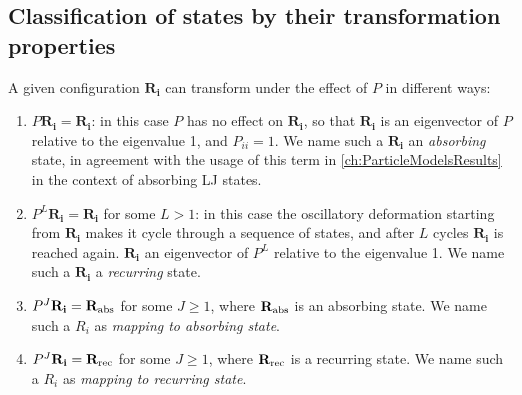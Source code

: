 \subsection{Classification of states by their transformation properties \label{sec:TMStateClassification}}

A given configuration $\mathbf{R_{i}}$ can transform under the effect of $P$ in different ways:
\begin{enumerate}
	\item \label{it:AbsorbingState} $P \mathbf{R_{i}} = \mathbf{R_{i}}$: in this case $P$ has no effect on $\mathbf{R_{i}}$, so that $\mathbf{R_{i}}$ is an eigenvector of $P$ relative to the eigenvalue 1, and $P_{ii}=1$. We name such a $\mathbf{R_{i}}$ an \emph{absorbing} state, in agreement with the usage of this term in \autoref{ch:ParticleModelsResults} in the context of absorbing LJ states.
	\item \label{it:RecurringState} $P^{L} \mathbf{R_{i}} = \mathbf{R_{i}}$ for some $L > 1$: in this case the oscillatory deformation starting from  $\mathbf{R_{i}}$ makes it cycle through a sequence of states, and after $L$ cycles $\mathbf{R_{i}}$ is reached again. $\mathbf{R_{i}}$ an eigenvector of $P^{L}$ relative to the eigenvalue 1. We name such a $\mathbf{R_{i}}$ a \emph{recurring} state.
	\item \label{it:MappingAnAbsorbingState} $P^{J} \mathbf{R_{i}} = \mathbf{R_{\rm abs}}$ for some $J \geq 1$, where $\mathbf{R_{\rm abs}}$ is an absorbing state. We name such a $R_{i}$ as \emph{mapping to absorbing state}.
	\item \label{it:MappingARecurringState} $P^{J} \mathbf{R_{i}} = \mathbf{R_{\rm rec}}$ for some $J \geq 1$, where $\mathbf{R_{\rm rec}}$ is a recurring state. We name such a $R_{i}$ as \emph{mapping to recurring state}.
\end{enumerate}

